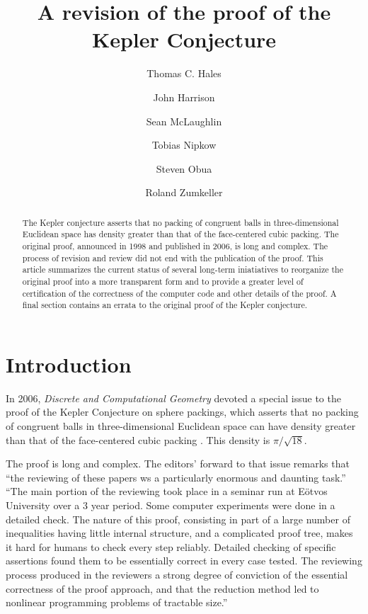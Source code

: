 \documentclass[11pt]{amsart}
\begin{document}
\title{A revision of the proof of the Kepler Conjecture}

\author[Hales]{Thomas C. Hales}
\address[T.~Hales]{Math Department, University of Pittsburgh}

\author[Harrison]{John Harrison}
\address[J.~Harrison]{Intel Corporation,  JF1-13, 2111 NE 25th Avenue
 Hillsboro, OR 97124
 USA}

\author[McLaughlin]{Sean McLaughlin}
\address[S.~McLaughlin]{CMU}

\author[Nipkow]{Tobias Nipkow}
\address[T.~Nipkow]{-}

\author[Obua]{Steven Obua}
\address[S.~Obua]{-}

\author[Zumkeller]{Roland Zumkeller}
\address[R.~Zumkeller]{-}

\begin{abstract}
The Kepler conjecture asserts that no packing of congruent balls in three-dimensional Euclidean space 
has density greater than that of the face-centered cubic packing.  The original proof,
announced in 1998 and published in 2006, is long and complex. The process of  revision and review did not end with the publication of the proof.
This article summarizes the current status of several long-term iniatiatives to
reorganize the original proof into a more transparent form and to provide a greater
level of certification of the correctness of the computer code and other details of the proof.
A final section contains an errata to the original proof of the Kepler conjecture.
\end{abstract}


\maketitle

\section{Introduction}

In 2006, {\it Discrete and Computational Geometry} devoted a special issue to the
proof of the Kepler Conjecture on sphere packings, which asserts that no
packing of congruent balls in three-dimensional Euclidean space can
have density greater than that of the face-centered cubic packing \cite{Hales:2006:DCG}.
This density is $\pi/\sqrt{18}$.

The proof is long and complex.  The editors' forward to that issue remarks
that ``the reviewing of these papers ws a particularly enormous and daunting task.''
``The main portion of the reviewing took place in a seminar run at E\"otvos University
over a 3 year period.  Some computer experiments were done in a detailed check.
The nature of this proof, consisting in part of a large number of inequalities having
little internal structure, and a complicated proof tree, makes it hard for humans
to check every step reliably.  Detailed checking of specific assertions found them to
be essentially correct in every case tested.  The reviewing process produced in the
reviewers a strong degree of conviction of the essential correctness of the proof
approach, and that the reduction method led to nonlinear programming problems of
tractable size.''
\end{document}
